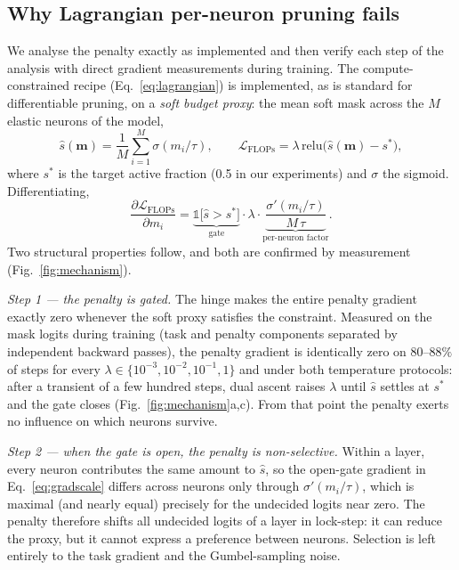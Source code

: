 \documentclass[fleqn,10pt]{article}
\newcommand{\bm}{\mathbf{m}}
\begin{document}
\subsection*{Why Lagrangian per-neuron pruning fails}

We analyse the penalty exactly as implemented and then verify each
step of the analysis with direct gradient measurements during
training. The compute-constrained recipe (Eq.~\ref{eq:lagrangian})
is implemented, as is standard for differentiable pruning, on a
\emph{soft budget proxy}: the mean soft mask across the $M$ elastic
neurons of the model,
\begin{equation}
\label{eq:proxy}
\hat{s}(\bm) = \frac{1}{M}\sum_{i=1}^{M} \sigma(m_i/\tau),
\qquad
\mathcal{L}_{\mathrm{FLOPs}}
 = \lambda\,\mathrm{relu}\!\bigl(\hat{s}(\bm) - s^{*}\bigr),
\end{equation}
where $s^{*}$ is the target active fraction (0.5 in our
experiments) and $\sigma$ the sigmoid. Differentiating,
\begin{equation}
\label{eq:gradscale}
\frac{\partial \mathcal{L}_{\mathrm{FLOPs}}}{\partial m_i}
 = \underbrace{\mathbb{1}\bigl[\hat{s} > s^{*}\bigr]}_{\text{gate}}
   \cdot \lambda \cdot
   \underbrace{\frac{\sigma'(m_i/\tau)}{M\,\tau}}_{\text{per-neuron factor}}.
\end{equation}
Two structural properties follow, and both are confirmed by
measurement (Fig.~\ref{fig:mechanism}).

\emph{Step 1 --- the penalty is gated.} The hinge makes the entire
penalty gradient exactly zero whenever the soft proxy satisfies the
constraint. Measured on the mask logits during training (task and
penalty components separated by independent backward passes), the
penalty gradient is identically zero on $80$--$88\%$ of steps for
every $\lambda \in \{10^{-3},10^{-2},10^{-1},1\}$ and under both
temperature protocols: after a transient of a few hundred steps,
dual ascent raises $\lambda$ until $\hat{s}$ settles at $s^{*}$ and
the gate closes (Fig.~\ref{fig:mechanism}a,c). From that point the
penalty exerts no influence on which neurons survive.

\emph{Step 2 --- when the gate is open, the penalty is
non-selective.} Within a layer, every neuron contributes the same
amount to $\hat{s}$, so the open-gate gradient in
Eq.~\ref{eq:gradscale} differs across neurons only through
$\sigma'(m_i/\tau)$, which is maximal (and nearly equal) precisely
for the undecided logits near zero. The penalty therefore shifts all
undecided logits of a layer in lock-step: it can reduce the proxy,
but it cannot express a preference between neurons. Selection is
left entirely to the task gradient and the Gumbel-sampling noise.
\end{document}
